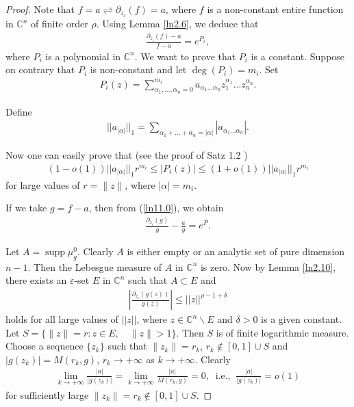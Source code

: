 \documentclass[10pt,a4paper]{amsart}
\begin{document}
\begin{proof} Note that $f=a\rightleftharpoons \partial_{z_i}(f)=a$, where $f$ is a non-constant entire function in $\mathbb{C}^n$ of finite order $\rho$. Using Lemma \ref{ln2.6}, we deduce that
\begin{align}\label{ln11.0}
\frac{\partial_{z_i}(f)-a}{f-a}=e^{P_i},
\end{align}
where $P_i$ is a polynomial in $\mathbb{C}^n$. We want to prove that $P_i$ is a constant. Suppose on contrary that $P_i$ is non-constant and let $\deg(P_i)=m_i$. Set
\begin{align*}
P_i(z)=\sum\limits_{\alpha_1,\ldots,\alpha_n=0}^{m_i}a_{\alpha_1\ldots\alpha_n}z_1^{\alpha_1}\ldots z_n^{\alpha_n}.
\end{align*}

Define
\begin{align*}
||a_{|\alpha|}||_{1}=\sum\limits_{\alpha_1+\ldots+\alpha_n=|\alpha|} |a_{\alpha_1\ldots\alpha_n}|.
\end{align*}

Now one can easily prove that (see the proof of Satz 1.2 \cite{Jank-Volkmann-1985})
\begin{align}\label{ln11.0a}
(1-o(1))||a_{|\alpha|}||_1r^{m_i}\leq |P_i(z)|\leq (1+o(1))||a_{|\alpha|}||_1r^{m_i}
\end{align}
for large values of $r=\|z\|$, where $|\alpha|=m_i$.

If we take $g=f-a$, then from (\ref{ln11.0}), we obtain
\begin{align}\label{ln11.3}
\frac{\partial_{z_i}(g)}{g}-\frac{a}{g}=e^P.
\end{align}

Let $A=\operatorname{supp}\mu^0_g$. Clearly $A$ is either empty or an analytic set of pure dimension $n-1$. Then the Lebesgue measure of $A$ in $\mathbb{C}^n$ is zero. Now by Lemma \ref{ln2.10}, there exists an $\varepsilon$-set $E$ in $\mathbb{C}^n$ such that $A\subset E$ and
\begin{align}\label{ln11.1} 
\left|\frac{\partial_{z_i}(g(z))}{g(z)}\right|\leq ||z||^{\rho-1+\delta}
\end{align}
holds for all large values of $||z||$, where $z\in \mathbb{C}^n\backslash E$ and $\delta>0$ is a given constant.
Let $S=\{\|z\|=r: z\in E,\quad \|z\|>1\}$. Then $S$ is of finite logarithmic measure. Choose a sequence $\{z_k\}$ such that $\|z_k\|=r_k$, $r_k\not\in [0,1]\cup S$ and $|g(z_k)|=M(r_k,g)$, $r_k\to +\infty$ as $k\to +\infty$. Clearly
\begin{align}\label{ln11.2} 
\lim\limits_{k\rightarrow +\infty}\frac{|a|}{|g(z_k)|}=\lim\limits_{k\rightarrow +\infty}\frac{|a|}{M(r_k,g)}=0,\;\;\text{i.e.,}\;\;\frac{|a|}{|g(z_k)|}=o(1)
\end{align}
for sufficiently large $\|z_k\|=r_k\not\in [0,1]\cup S$. 


\end{proof}
\end{document}
